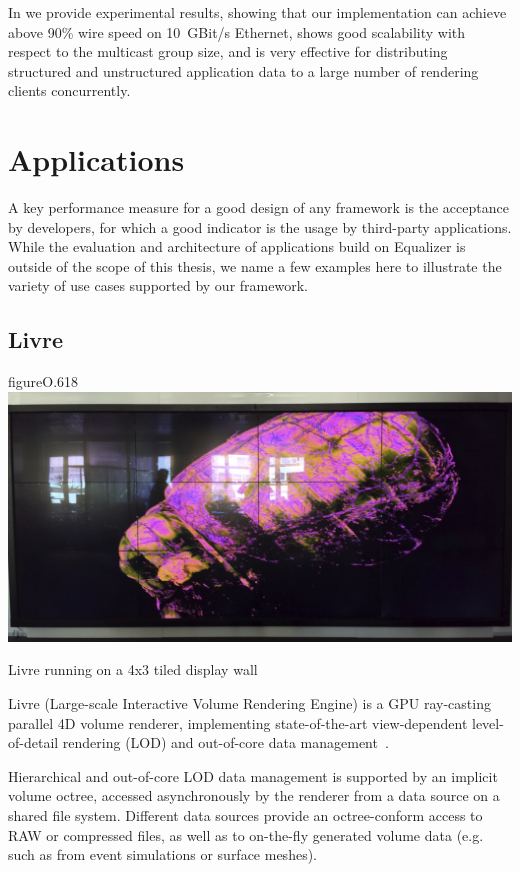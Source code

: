 In \cite{ESP:18} we provide experimental results, showing that our
implementation can achieve above 90\% wire speed on 10~GBit/s Ethernet, shows
good scalability with respect to the multicast group size, and is very effective
for distributing structured and unstructured application data to a large number
of rendering clients concurrently.

\chapter{Applications}\label{sApplications}

A key performance measure for a good design of any framework is the acceptance
by developers, for which a good indicator is the usage by third-party
applications. While the evaluation and architecture of applications build on
Equalizer is outside of the scope of this thesis, we name a few examples here
to illustrate the variety of use cases supported by our framework.

\section{Livre}

\begin{wrapfloat}{figure}{O}{.618\textwidth}
  \includegraphics[width=.618\textwidth]{images/livre}
  {\caption{\label{fLivre}Livre running on a 4x3 tiled display wall}}
\end{wrapfloat}

Livre (Large-scale Interactive Volume Rendering Engine) is a GPU ray-casting
parallel 4D volume renderer, implementing state-of-the-art view-dependent
level-of-detail rendering (LOD) and out-of-core data
management~\cite{EHKRW:06}.

Hierarchical and out-of-core LOD data management is supported by an implicit
volume octree, accessed asynchronously by the renderer from a data source on a
shared file system. Different data sources provide an octree-conform access to
RAW or compressed files, as well as to on-the-fly generated volume data (e.g.
such as from event simulations or surface meshes).

